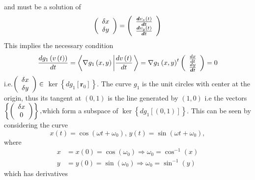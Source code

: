 \documentclass[aps,preprint]{revtex4}%
\begin{document}
and must be a solution of
\begin{equation}
\left(
\begin{array}
[c]{c}%
\delta x\\
\delta y
\end{array}
\right)  =\left(
\begin{array}
[c]{c}%
\frac{\boldsymbol{d}v_{x}\left(  t\right)  }{\boldsymbol{d}t}\\
\frac{\boldsymbol{d}v_{y}\left(  t\right)  }{\boldsymbol{d}t}%
\end{array}
\right)
\end{equation}
This implies the necessary condition
\begin{equation}
\frac{dg_{1}\left(  v\left(  t\right)  \right)  }{dt}=\left\langle \nabla
g_{1}\left(  x,y\right)  \left\vert \frac{dv\left(  t\right)  }{dt}\right.
\right\rangle =\nabla g_{1}\left(  x,y\right)  ^{t}\left(
\begin{array}
[c]{c}%
\frac{dx}{dt}\\
\frac{dy}{\boldsymbol{d}t}%
\end{array}
\right)  =0
\end{equation}
i.e.$\left(
\begin{array}
[c]{c}%
\delta x\\
\delta y
\end{array}
\right)  \in$ $\ker\left\{  dg_{1}\left[  \boldsymbol{r}_{0}\right]  \right\}
$. The curve $g_{1}$ is the unit circles with center at the origin, thus its
tangent at $\left(  0,1\right)  $ is the line generated by $\left(
1,0\right)  $ i.e the vectors $\left\{  \left(
\begin{array}
[c]{c}%
\delta x\\
0
\end{array}
\right)  \right\}  ,$which form a subspace of $\ker\left\{  dg_{1}\left[
\left(  0,1\right)  \right]  \right\}  .$ This can be seen by considering the
curve
\begin{equation}
x\left(  t\right)  =\cos\left(  \omega t+\omega_{0}\right)  ,\,y\left(
t\right)  =\sin\left(  \omega t+\omega_{0}\right)  ,
\end{equation}
where
\begin{align}
x  &  =x\left(  0\right)  =\cos\left(  \omega_{0}\right)  \Rightarrow
\omega_{0}=\cos^{-1}\left(  x\right) \nonumber\\
y  &  =y\left(  0\right)  =\sin\left(  \omega_{0}\right)  \Rightarrow
\omega_{0}=\sin^{-1}\left(  y\right)
\end{align}
which has derivatives
\end{document}
